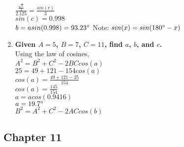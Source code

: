 \begin{enumerate}
\tab \tab $\frac{\frac{\sqrt{2}}{2}}{2.125} = \frac{sin(c)}{3}$\\

\tab \tab $sin(c) = 0.998$\\

\tab \tab $b = asin(0.998) = 93.23^\circ$ Note: $sin(x) = sin(180^\circ - x)$\\

\item{\bf Given $A=5$, $B=7$, $C=11$, find $a$, $b$, and $c$.}\\

\tab \tab Using the law of cosines,\\

\tab \tab $A^2 = B^2 + C^2 - 2BCcos(a)$\\

\tab \tab $25 = 49 + 121 - 154cos(a)$\\

\tab \tab $cos(a) = \frac{49 + 121 -25}{154}$\\

\tab \tab $cos(a) = \frac{145}{154}$\\

\tab \tab $a = acos(0.9416)$\\

\tab \tab $a = 19.7^\circ$\\

\tab \tab $B^2 = A^2 + C^2 - 2ACcos(b)$\\

\end{enumerate}

\clearpage
\subsection{Chapter 11}

